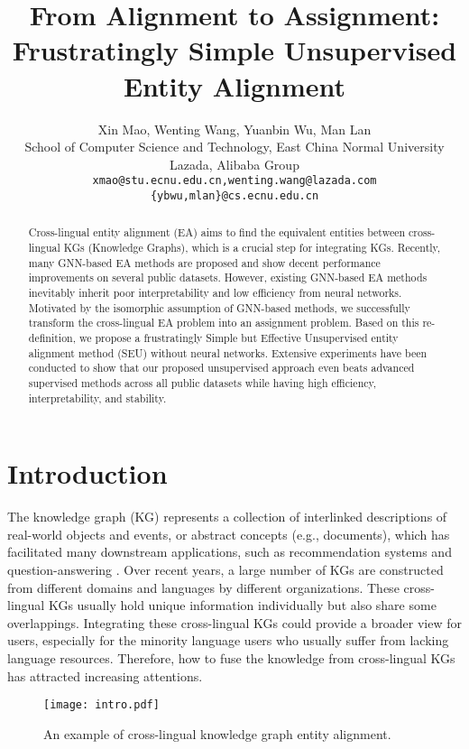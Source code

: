 \documentclass[11pt]{article}
\title{From Alignment to Assignment: \\Frustratingly Simple Unsupervised Entity Alignment}
\author{Xin Mao, Wenting Wang, Yuanbin Wu, Man Lan\\
   School of Computer Science and Technology, East China Normal University\\
  Lazada, Alibaba Group \\
  \texttt{xmao@stu.ecnu.edu.cn,wenting.wang@lazada.com}\\\texttt{\{ybwu,mlan\}@cs.ecnu.edu.cn}}
\begin{document}
\maketitle
\begin{abstract}
Cross-lingual entity alignment (EA) aims to find the equivalent entities between cross-lingual KGs (Knowledge Graphs), which is a crucial step for integrating KGs.
Recently, many GNN-based EA methods are proposed and show decent performance improvements on several public datasets.
However, existing GNN-based EA methods inevitably inherit poor interpretability and low efficiency from neural networks.
Motivated by the isomorphic assumption of GNN-based methods, we successfully transform the cross-lingual EA problem into an assignment problem.
Based on this re-definition, we propose a frustratingly Simple but Effective Unsupervised entity alignment method (SEU) without neural networks.
Extensive experiments have been conducted to show that our proposed unsupervised approach even beats advanced supervised methods across all public datasets while having high efficiency, interpretability, and stability.
\end{abstract}

\section{Introduction}
\label{sec:intro}
The knowledge graph (KG) represents a collection of interlinked descriptions of real-world objects and events, or abstract concepts (e.g., documents), which has facilitated many downstream applications, such as recommendation systems \cite{DBLP:conf/www/0003W0HC19,DBLP:conf/www/WangZZLXG19} and question-answering \cite{DBLP:conf/www/ZhaoXQB20,DBLP:conf/wsdm/QiuWJZ20}.
Over recent years, a large number of KGs are constructed from different domains and languages by different organizations.
These cross-lingual KGs usually hold unique information individually but also share some overlappings.
Integrating these cross-lingual KGs could provide a broader view for users, especially for the minority language users who usually suffer from lacking language resources.
Therefore, how to fuse the knowledge from cross-lingual KGs has attracted increasing attentions.

\begin{figure}
  \centering
  \texttt{[image: intro.pdf]}
  \caption{An example of cross-lingual knowledge graph entity alignment.}\label{fig:intro}
\end{figure}
\end{document}
